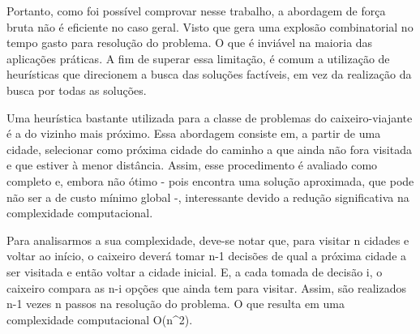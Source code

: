 \documentclass[a4paper, 12pt]{article} %
\begin{document}
	Portanto, como foi possível comprovar nesse trabalho, a abordagem de força bruta não é eficiente no caso geral. Visto que gera uma explosão combinatorial no tempo gasto para resolução do problema. O que é inviável na maioria das aplicações práticas. A fim de superar essa limitação, é comum a utilização de heurísticas que direcionem a busca das soluções factíveis, em vez da realização da busca por todas as soluções.
	
	Uma heurística bastante utilizada para a classe de problemas do caixeiro-viajante é a do vizinho mais próximo. Essa abordagem consiste em, a partir de uma cidade, selecionar como próxima cidade do caminho a que ainda não fora visitada e que estiver à menor distância. Assim, esse procedimento é avaliado como completo e, embora não ótimo - pois encontra uma solução aproximada, que pode não ser a de custo mínimo global -, interessante devido a redução significativa na complexidade computacional.
	
	Para analisarmos a sua complexidade, deve-se notar que, para visitar n cidades e voltar ao início, o caixeiro deverá tomar n-1 decisões de qual a próxima cidade a ser visitada e então voltar a cidade inicial. E, a cada tomada de decisão i, o caixeiro compara as n-i opções que ainda tem para visitar. Assim, são realizados n-1 vezes n passos na resolução do problema. O que resulta em uma complexidade computacional O(n^2).
	
\end{document}

